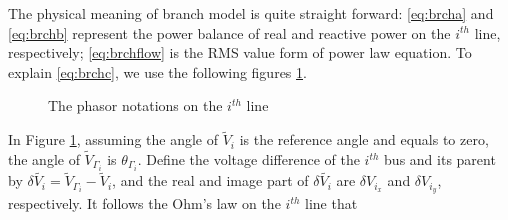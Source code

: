 \documentclass{article}
\begin{document}
The physical meaning of branch model is quite straight forward: \eqref{eq:brcha} and \eqref{eq:brchb} represent the power balance of real and reactive power on the $i^{th}$ line, respectively; \eqref{eq:brchflow} is the RMS value form of power law equation. To explain \eqref{eq:brchc}, we use the following figures \ref{fig:phsor_}.
\begin{figure}[ht]
\centering

    \caption{The phasor notations on the $i^{th}$ line} 
    \label{fig:phsor_}
\end{figure}
In Figure \ref{fig:phsor_}, assuming the angle of $\tilde V_i$ is the reference angle and equals to zero, the angle of $\tilde V_{\Gamma_i}$ is $\theta_{\Gamma_i}$. Define the voltage difference of the $i^{th}$ bus and its parent by $\delta \tilde{V_i} = \tilde V_{\Gamma_i}-\tilde V_i $, and the real and image part of $\delta \tilde{V_i}$ are $\delta {V_{i_x}}$ and $\delta {V_{i_y}}$, respectively. It follows the Ohm's law on the $i^{th}$ line that
\end{document}
